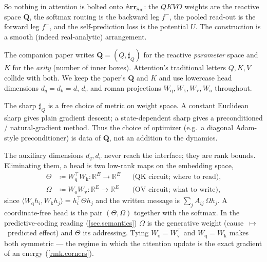 \documentclass[11pt]{article}
\theoremstyle{plain}
\theoremstyle{definition}
\theoremstyle{remark}
\newcommand{\rr}{\mathbb{R}}
\newcommand{\Cat}[1]{\mathbf{#1}}
\newcommand{\Sm}{\mathrm{Sm}}
\newcommand{\arr}{\mathbb{A}\Cat{rr}}    %
\newcommand{\sarr}{\arr_{\Sm}}           %
\newcommand{\rv}[1]{\mathbf{#1}}         %
\newcommand{\sharpR}{\sharp}
\newcommand{\inpt}[1]{#1^{-}}
\newcommand{\outp}[1]{#1^{+}}
\newcommand{\Wq}{W_{\mathrm q}}
\newcommand{\Wk}{W_{\mathrm k}}
\newcommand{\Wv}{W_{\mathrm v}}
\newcommand{\Wo}{W_{\mathrm o}}
\begin{document}
So nothing in attention is bolted onto $\sarr$: the $\mathit{QKVO}$ weights
are the reactive space $\rv Q$, the softmax routing is the backward leg
$\inpt f$, the pooled read-out is the forward leg $\outp f$, and the
self-prediction loss is the potential $U$. The construction is a smooth
(indeed real-analytic) arrangement.

\begin{remark}\label{rmk.clash}
The companion paper writes $\rv Q=(Q,\sharpR_Q)$ for the reactive
\emph{parameter} space and $K$ for the \emph{arity} (number of inner
boxes). Attention's traditional letters $Q,K,V$ collide with both. We
keep the paper's $\rv Q$ and $K$ and use lowercase head dimensions
$d_q=d_k=d$, $d_v$ and roman projections $\Wq,\Wk,\Wv,\Wo$ throughout.
\end{remark}

\begin{remark}\label{rmk.optimizer}
The sharp $\sharpR_Q$ is a free choice of metric on weight space. A
constant Euclidean sharp gives plain gradient descent; a state-dependent
sharp gives a preconditioned / natural-gradient method. Thus the choice
of optimizer (e.g.\ a diagonal Adam-style preconditioner) is data of
$\rv Q$, not an addition to the dynamics.
\end{remark}

\begin{remark}\label{rmk.circuits}
The auxiliary dimensions $d_q,d_v$ never reach the interface; they are rank
bounds. Eliminating them, a head is two low-rank maps on the embedding
space,
\[
\begin{aligned}
  \Theta&\coloneqq\Wq^{\top}\Wk\colon\rr^{E}\to\rr^{E}
   &&\text{(QK circuit; where to read)},\\
  \Omega&\coloneqq\Wo\Wv\colon\rr^{E}\to\rr^{E}
   &&\text{(OV circuit; what to write)},
\end{aligned}
\]
since $\langle\Wq h_i,\Wk h_j\rangle=h_i^{\top}\Theta h_j$ and the written
message is $\sum_j A_{ij}\,\Omega h_j$. A coordinate-free head is the pair
$(\Theta,\Omega)$ together with the softmax. In the predictive-coding
reading (\cref{sec.semantics}) $\Omega$ is the generative weight
(cause~$\mapsto$~predicted effect) and $\Theta$ its addressing. Tying
$\Wo=\Wv^{\top}$ and $\Wq=\Wk$ makes both symmetric --- the regime in which
the attention update is the exact gradient of an energy (\cref{rmk.corners}).
\end{remark}
\end{document}
